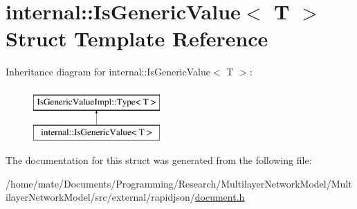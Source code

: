 \hypertarget{structinternal_1_1IsGenericValue}{}\section{internal\+:\+:Is\+Generic\+Value$<$ T $>$ Struct Template Reference}
\label{structinternal_1_1IsGenericValue}
Inheritance diagram for internal\+:\+:Is\+Generic\+Value$<$ T $>$\+:\begin{figure}[H]
\begin{center}
\leavevmode
\includegraphics[height=2.000000cm]{structinternal_1_1IsGenericValue}
\end{center}
\end{figure}


The documentation for this struct was generated from the following file\+:\begin{DoxyCompactItemize}
\item 
/home/mate/\+Documents/\+Programming/\+Research/\+Multilayer\+Network\+Model/\+Multilayer\+Network\+Model/src/external/rapidjson/\hyperlink{document_8h}{document.\+h}\end{DoxyCompactItemize}
